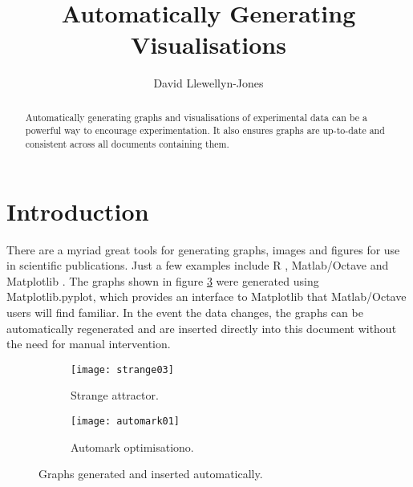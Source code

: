 \documentclass[envcountsame]{llncs}
\begin{document}
%
\frontmatter          %
%
\pagestyle{headings}  %
%
\mainmatter              %
%
\title{Automatically Generating Visualisations}
%
%
\author{David Llewellyn-Jones}
%
%
%

\maketitle              %

\begin{abstract}
Automatically generating graphs and visualisations of experimental data can be a powerful way to encourage experimentation. It also ensures graphs are up-to-date and consistent across all documents containing them.
\end{abstract}


\section{Introduction}

There are a myriad great tools for generating graphs, images and figures for use in scientific publications. Just a few examples include R \cite{introtor}, Matlab/Octave \cite{octave} and Matplotlib \cite{matplotlib}. The graphs shown in figure \ref{fig:autogen} were generated using Matplotlib.pyplot, which provides an interface to Matplotlib that Matlab/Octave users will find familiar. In the event the data changes, the graphs can be automatically regenerated and are inserted directly into this document without the need for manual intervention.

\begin{figure}[h!]
\centering
\begin{subfigure}[t]{0.49\textwidth}
\centering
\texttt{[image: strange03]}%
\caption{Strange attractor.}
\label{fig:strange}
\end{subfigure}
\begin{subfigure}[t]{0.49\textwidth}
\centering
\texttt{[image: automark01]}%
\caption{Automark optimisationo.}
\label{fig:automar}
\end{subfigure}
\caption{Graphs generated and inserted automatically.}
\label{fig:autogen}
\end{figure}


%
%






\end{document}
